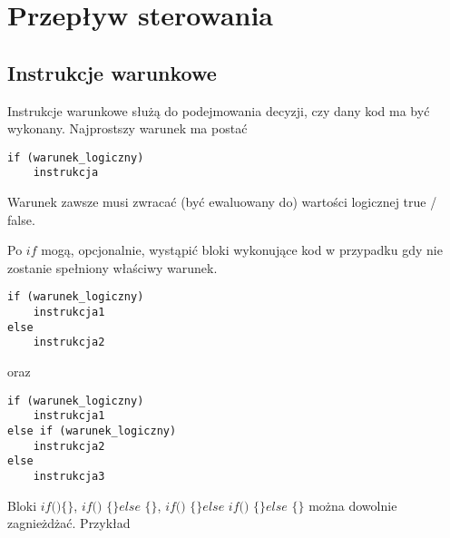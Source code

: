\documentclass[11pt]{article}
\begin{document}
\section{Przepływ sterowania}
\subsection{Instrukcje warunkowe}
Instrukcje warunkowe służą do podejmowania decyzji, czy dany kod ma być wykonany. Najprostszy warunek ma postać 
\begin{lstlisting}
if (warunek_logiczny) 
	instrukcja
\end{lstlisting}
Warunek zawsze musi zwracać (być ewaluowany do) wartości logicznej true / false. 

Po $\textit{if}$ mogą, opcjonalnie, wystąpić bloki wykonujące kod w przypadku gdy nie zostanie spełniony właściwy warunek.
\begin{lstlisting}
if (warunek_logiczny) 
	instrukcja1
else
	instrukcja2
\end{lstlisting}
oraz 
\begin{lstlisting}
if (warunek_logiczny) 
	instrukcja1
else if (warunek_logiczny) 
	instrukcja2
else
	instrukcja3
\end{lstlisting}
Bloki $\textit{if()\{ \}}$, $\textit{if() \{ \} else \{ \}}$, $\textit{if() \{ \} else if() \{ \} else \{ \}}$ można dowolnie zagnieżdżać. Przykład

\end{document}
